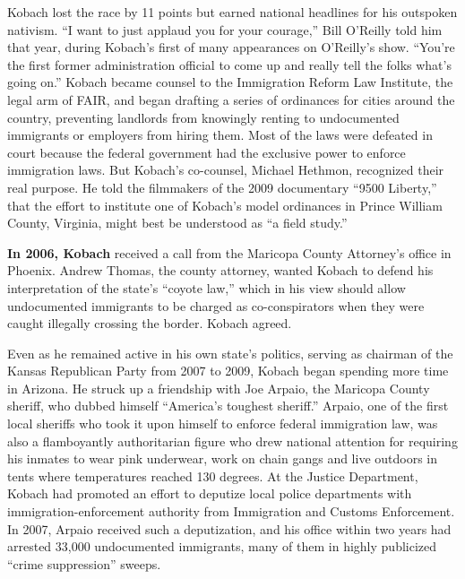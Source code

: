 Kobach lost the race by 11 points but earned national headlines for his
outspoken nativism. ``I want to just applaud you for your courage,''
Bill O'Reilly told him that year, during Kobach's first of many
appearances on O'Reilly's show. ``You're the first former administration
official to come up and really tell the folks what's going on.'' Kobach
became counsel to the Immigration Reform Law Institute, the legal arm of
FAIR, and began drafting a series of ordinances for cities around the
country, preventing landlords from knowingly renting to undocumented
immigrants or employers from hiring them. Most of the laws were defeated
in court because the federal government had the exclusive power to
enforce immigration laws. But Kobach's co-counsel, Michael Hethmon,
recognized their real purpose. He told the filmmakers of the 2009
documentary ``9500 Liberty,'' that the effort to institute one of
Kobach's model ordinances in Prince William County, Virginia, might best
be understood as ``a field study.''

\textbf{In 2006, Kobach} received a call from the Maricopa County
Attorney's office in Phoenix. Andrew Thomas, the county attorney, wanted
Kobach to defend his interpretation of the state's ``coyote law,'' which
in his view should allow undocumented immigrants to be charged as
co-conspirators when they were caught illegally crossing the border.
Kobach agreed.

Even as he remained active in his own state's politics, serving as
chairman of the Kansas Republican Party from 2007 to 2009, Kobach began
spending more time in Arizona. He struck up a friendship with Joe
Arpaio, the Maricopa County sheriff, who dubbed himself ``America's
toughest sheriff.'' Arpaio, one of the first local sheriffs who took it
upon himself to enforce federal immigration law, was also a flamboyantly
authoritarian figure who drew national attention for requiring his
inmates to wear pink underwear, work on chain gangs and live outdoors in
tents where temperatures reached 130 degrees. At the Justice Department,
Kobach had promoted an effort to deputize local police departments with
immigration-enforcement authority from Immigration and Customs
Enforcement. In 2007, Arpaio received such a deputization, and his
office within two years had arrested 33,000 undocumented immigrants,
many of them in highly publicized ``crime suppression'' sweeps.

